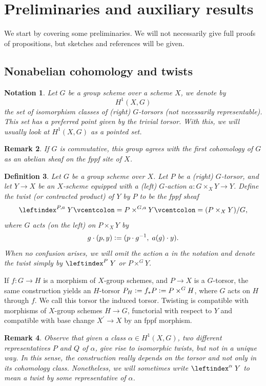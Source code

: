 \documentclass[a4paper,english,12pt]{amsart}
\newtheorem{definition}{Definition}[section]
\newtheorem{notation}[definition]{Notation}
\newtheorem{remark}[definition]{Remark}
\numberwithin{equation}{section}
\newcommand{\defeq}{\vcentcolon=}
\renewcommand{\_}{\rule{0.25cm}{0.4pt}}
\begin{document}
\section{Preliminaries and auxiliary results}\label{1}
We start by covering some preliminaries. We will not necessarily give full proofs of propositions, but sketches and references will be given.

\subsection{Nonabelian cohomology and twists}\label{1.1}
\begin{notation}
Let $G$ be a group scheme over a scheme $X$, we denote by
\[
H^{1}(X,G)
\]
the set of isomorphism classes of (right) $G$-torsors (not necessarily representable). This set has a preferred point given by the trivial torsor. With this, we will usually look at $H^{1}(X,G)$ as a pointed set.
\end{notation}

\begin{remark}
If $G$ is commutative, this group agrees with the first cohomology of $G$ as an abelian sheaf on the fppf site of $X$.
\end{remark}

\begin{definition}
Let $G$ be a group scheme over $X$. Let $P$ be a (right) $G$-torsor, and let $Y \to X$ be an $X$-scheme equipped with a (left) $G$-action $a\colon G\times_{X}Y\to Y$. Define the twist (or contracted product) of $Y$ by $P$ to be the fppf sheaf
\[
\leftindex^{P,a}{\;Y}\defeq P\times^{G,a} Y \defeq (P\times_{X} Y)/G,
\]
where $G$ acts (on the left) on $P\times_{X} Y$ by
\[
g\cdot (p,y) \defeq (p\cdot g^{-1},\; a(g)\cdot y).
\]
When no confusion arises, we will omit the action $a$ in the notation and denote the twist simply by $\leftindex^{P}{\;Y}$ or $P\times^{G} Y$.
\end{definition}

If $f\colon G\to H$ is a morphism of $X$-group schemes, and $P\to X$ is a $G$-torsor, the same construction yields an $H$-torsor $P_{H}\defeq f_{\ast}P\defeq P\times^{G}H$, where $G$ acts on $H$ through $f$. We call this torsor the induced torsor. Twisting is compatible with morphisms of $X$-group schemes $H\to G$, functorial with respect to $Y$ and compatible with base change $X^{\prime}\to X$ by an fppf morphism.

\begin{remark}
Observe that given a class $\alpha\in H^{1}(X,G)$, two different representatives $P$ and $Q$ of $\alpha$, give rise to isomorphic twists, but not in a unique way. In this sense, the construction really depends on the torsor and not only in its cohomology class. Nonetheless, we will sometimes write $\leftindex^{\alpha}{\;Y}$ to mean a twist by some representative of $\alpha$.
\end{remark}
\end{document}

